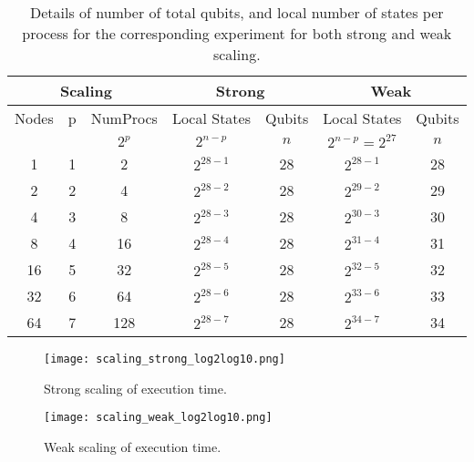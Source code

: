 \begin{table}[H]
\centering
    \begin{tabular}{|c|c|c||c|c||c|c|}
        \hline
        \multicolumn{3}{|c||}{Scaling} & \multicolumn{2}{|c||}{Strong} & \multicolumn{2}{|c|}{Weak}\\
        \hline
        Nodes           &  p    & NumProcs   & Local States  & Qubits      & Local States & Qubits \\
                   &     &  $2^p$  &  $ 2^{n-p}$  &   $n$      & $ 2^{n-p} = 2^{27}$ &  $n$\\
    
        \hline
        1               &   1   & 2                     & $2^{28-1}$                        & 28         &$2^{28-1}$&  28\\
        2               &   2   & 4                     & $2^{28-2}$                         & 28        &$2^{29-2}$&  29 \\
        4               &   3   & 8                     & $2^{28-3}$                         & 28        &$2^{30-3}$&  30 \\
        8               &   4   & 16                    & $2^{28-4}$                         & 28        &$2^{31-4}$&  31 \\
        16              &   5   & 32                    & $2^{28-5}$                         & 28        &$2^{32-5}$&  32 \\
        32              &   6   & 64                    & $2^{28-6}$                         & 28        &$2^{33-6}$&  33 \\
        64              &   7   & 128                   & $2^{28-7}$                        & 28         & $2^{34-7}$& 34 \\
     \hline
    \end{tabular}
    \caption{Details of number of total qubits, and local number of states per process for the corresponding experiment for both strong and weak scaling. }
    \label{tab:scaling_experiment_config}
\end{table}

\begin{figure}[H]
	\centering
	\begin{minipage}{.5\linewidth}
		\centering
		\texttt{[image: scaling\_strong\_log2log10.png]}
		\caption{Strong scaling of execution time.}
		\label{fig:strong_scaling}
	\end{minipage}%
	\begin{minipage}{.5\linewidth}
		\centering
		\texttt{[image: scaling\_weak\_log2log10.png]}
		\caption{Weak scaling of execution time.}
		\label{fig:weak_scaling}
	\end{minipage}
\end{figure}

